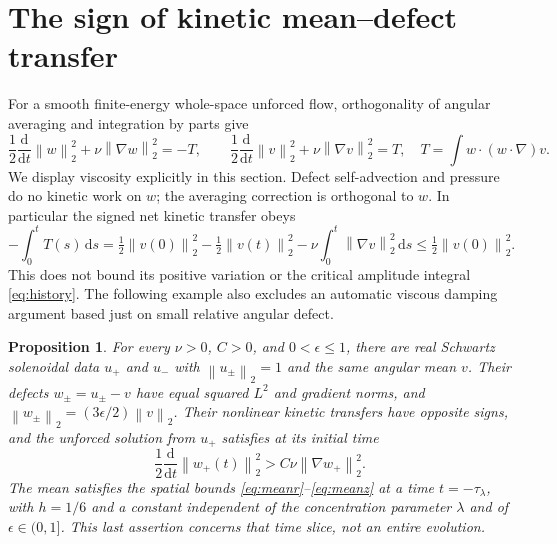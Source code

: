 \documentclass[11pt]{article}
\newtheorem{proposition}[theorem]{Proposition}
\theoremstyle{remark}
\newcommand{\dd}{\,\mathrm d}
\newcommand{\norm}[1]{\left\lVert#1\right\rVert}
\begin{document}
\section{The sign of kinetic mean--defect transfer}

For a smooth finite-energy whole-space unforced flow, orthogonality of
angular averaging and integration by parts give
\begin{equation}\label{eq:kinetictransfer}
 \frac12\frac{\mathrm d}{\mathrm dt}\norm w_2^2
       +\nu\norm{\nabla w}_2^2=-T,
 \qquad
 \frac12\frac{\mathrm d}{\mathrm dt}\norm v_2^2
       +\nu\norm{\nabla v}_2^2=T,
 \quad T=\int w\cdot(w\cdot\nabla)v.
\end{equation}
We display viscosity explicitly in this section. Defect self-advection
and pressure do no kinetic work on $w$; the averaging correction is
orthogonal to $w$. In particular the signed net kinetic transfer obeys
\[
 -\int_0^t T(s)\dd s
 =\tfrac12\norm{v(0)}_2^2-\tfrac12\norm{v(t)}_2^2
                         -\nu\int_0^t\norm{\nabla v}_2^2\dd s
 \leq\tfrac12\norm{v(0)}_2^2.
\]
This does not bound its positive variation or the critical amplitude
integral \eqref{eq:history}. The following example also excludes an automatic
viscous damping argument based just on small relative angular defect.

\begin{proposition}\label{prop:transfer}
For every $\nu>0$, $C>0$, and $0<\epsilon\leq1$, there are real
Schwartz solenoidal data $u_+$ and $u_-$ with $\norm{u_\pm}_2=1$
and the same angular mean $v$. Their defects $w_\pm=u_\pm-v$ have
equal squared $L^2$ and gradient norms, and
$\norm{w_\pm}_2=(3\epsilon/2)\norm v_2$.
Their nonlinear kinetic transfers have opposite signs, and the
unforced solution from $u_+$ satisfies at its initial time
\[
 \frac12\frac{\mathrm d}{\mathrm dt}\norm{w_+(t)}_2^2
                         >C\nu\norm{\nabla w_+}_2^2.
\]
The mean satisfies the spatial bounds
\eqref{eq:meanr}--\eqref{eq:meanz} at a time $t=-\tau_\lambda$,
with $h=1/6$ and a constant independent of the concentration parameter
$\lambda$ and of $\epsilon\in(0,1]$.
This last assertion concerns that time slice, not an entire evolution.
\end{proposition}
\end{document}
